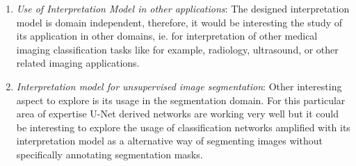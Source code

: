 \begin{enumerate}

\item \emph{Use of Interpretation Model in other applications}: The designed interpretation model is domain independent, therefore, it would be interesting the study of its application in other domains, ie. for interpretation of other medical imaging classification tasks like for example, radiology, ultrasound, or other related imaging applications. 

\item \emph{Interpretation model for unsupervised image segmentation}: Other interesting aspect to explore is its usage in the segmentation domain. For this particular area of expertise U-Net derived networks are working very well but it could be interesting to explore the usage of classification networks amplified with its interpretation model as a alternative way of segmenting images without specifically annotating segmentation masks.

\end{enumerate}
